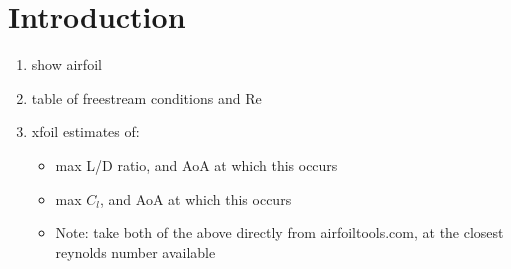 \section{Introduction}

\begin{enumerate}
	\item show airfoil
	\item table of freestream conditions and Re
	\item xfoil estimates of:
	\begin{itemize}
		\item max  L/D ratio, and AoA at which this occurs
		\item max $C_l$, and AoA at which this occurs
		\item Note: take both of the above directly from airfoiltools.com, at the closest reynolds number available
	\end{itemize}
\end{enumerate}

